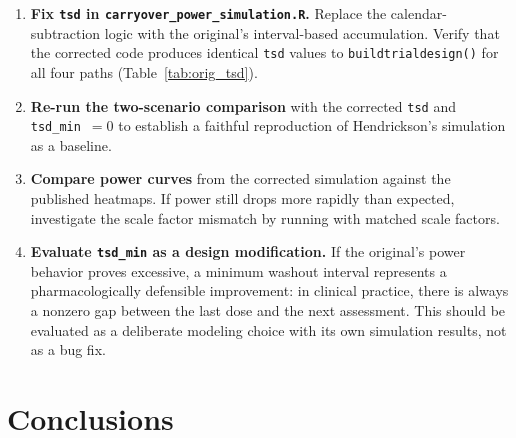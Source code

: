 \documentclass[11pt]{article}
\begin{document}
\begin{enumerate}
  \item \textbf{Fix \texttt{tsd} in
    \texttt{carryover\_power\_simulation.R}.} Replace the
    calendar-subtraction logic with the original's interval-based
    accumulation. Verify that the corrected code produces identical
    \texttt{tsd} values to \texttt{buildtrialdesign()} for all four
    paths (Table~\ref{tab:orig_tsd}).

  \item \textbf{Re-run the two-scenario comparison} with the corrected
    \texttt{tsd} and \texttt{tsd\_min}~$= 0$ to establish a faithful
    reproduction of Hendrickson's simulation as a baseline.

  \item \textbf{Compare power curves} from the corrected simulation
    against the published heatmaps. If power still drops more rapidly
    than expected, investigate the scale factor mismatch by running
    with matched scale factors.

  \item \textbf{Evaluate \texttt{tsd\_min} as a design modification.}
    If the original's power behavior proves excessive, a minimum
    washout interval represents a pharmacologically defensible
    improvement: in clinical practice, there is always a nonzero gap
    between the last dose and the next assessment. This should be
    evaluated as a deliberate modeling choice with its own simulation
    results, not as a bug fix.
\end{enumerate}

\section{Conclusions}
\end{document}

